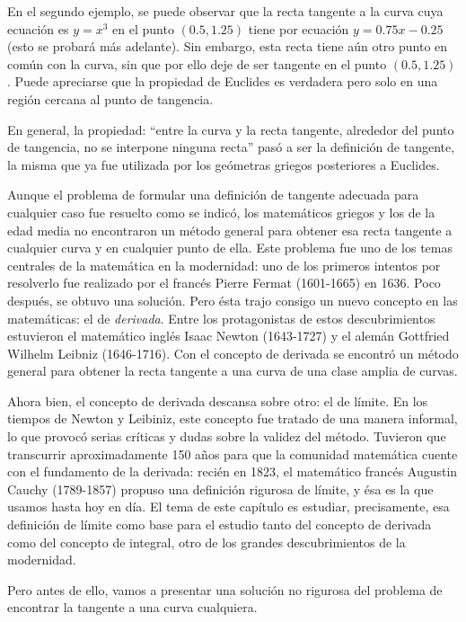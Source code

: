 En el segundo ejemplo, se puede observar que la recta tangente a la curva cuya ecuación es $y =
x^3$ en el punto $(0.5,1.25)$ tiene por ecuación $y = 0.75x - 0.25$ (esto se probará más adelante).
Sin embargo, esta recta tiene aún otro punto en común con la curva, sin que por ello deje de ser
tangente en el punto $(0.5,1.25)$. Puede apreciarse que la propiedad de Euclides es verdadera pero
solo en una región cercana al punto de tangencia.

En general, la propiedad: ``entre la curva y la recta tangente, alrededor del punto de tangencia,
no se interpone ninguna recta'' pasó a ser la definición de tangente, la misma que ya fue utilizada
por los geómetras griegos posteriores a Euclides.

Aunque el problema de formular una definición de tangente adecuada para cualquier caso fue resuelto
como se indicó, los matemáticos griegos y los de la edad media no encontraron un método general
para obtener esa recta tangente a cualquier curva y en cualquier punto de ella. Este problema fue
uno de los temas centrales de la matemática en la modernidad: uno de los primeros intentos por
resolverlo fue realizado por el francés Pierre Fermat (1601-1665) en 1636. Poco después, se obtuvo
una solución. Pero ésta trajo consigo un nuevo concepto en las matemáticas: el de \emph{derivada}.
Entre los protagonistas de estos descubrimientos estuvieron el matemático inglés Isaac Newton
(1643-1727) y el alemán Gottfried Wilhelm Leibniz (1646-1716). Con el concepto de derivada se
encontró un método general para obtener la recta tangente a una curva de una clase amplia de
curvas.

Ahora bien, el concepto de derivada descansa sobre otro: el de límite. En los tiempos de Newton y
Leibiniz, este concepto fue tratado de una manera informal, lo que provocó serias críticas y dudas
sobre la validez del método. Tuvieron que transcurrir aproximadamente 150 años para que la
comunidad matemática cuente con el fundamento de la derivada: recién en 1823, el matemático francés
Augustin Cauchy (1789-1857) propuso una definición rigurosa de límite, y ésa es la que usamos hasta
hoy en día. El tema de este capítulo es estudiar, precisamente, esa definición de límite como base
para el estudio tanto del concepto de derivada como del concepto de integral, otro de los grandes
descubrimientos de la modernidad.

Pero antes de ello, vamos a presentar una solución no rigurosa del problema de encontrar la
tangente a una curva cualquiera.

